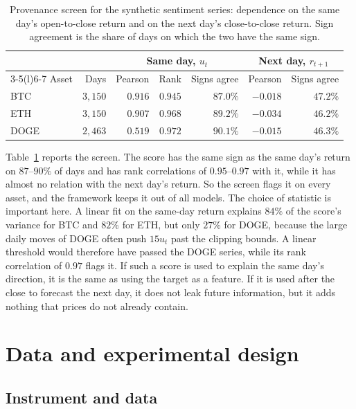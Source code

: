 \documentclass[preprint,12pt,authoryear,a4paper]{elsarticle}
\begin{document}
\begin{table}[htbp]\centering\small
\caption{Provenance screen for the synthetic sentiment series: dependence on the
same day's open-to-close return and on the next day's close-to-close return. Sign
agreement is the share of days on which the two have the same sign.}
\label{tab:leak}
\begin{tabular}{@{}lrrrrrr@{}}
\toprule
 & & \multicolumn{3}{c}{Same day, $u_t$} & \multicolumn{2}{c}{Next day, $r_{t+1}$} \\
\cmidrule(lr){3-5}\cmidrule(l){6-7}
Asset & Days & Pearson & Rank & Signs agree & Pearson & Signs agree \\
\midrule
BTC  & $3{,}150$ & $0.916$ & $0.945$ & $87.0\%$ & $-0.018$ & $47.2\%$ \\
ETH  & $3{,}150$ & $0.907$ & $0.968$ & $89.2\%$ & $-0.034$ & $46.2\%$ \\
DOGE & $2{,}463$ & $0.519$ & $0.972$ & $90.1\%$ & $-0.015$ & $46.3\%$ \\
\bottomrule
\end{tabular}
\end{table}

Table~\ref{tab:leak} reports the screen. The score has the same sign as the same
day's return on $87$--$90\%$ of days and has rank correlations of $0.95$--$0.97$
with it, while it has almost no relation with the next day's return. So the screen
flags it on every asset, and the framework keeps it out of all models. The choice
of statistic is important here. A linear fit on the same-day return explains $84\%$
of the score's variance for BTC and $82\%$ for ETH, but only $27\%$ for DOGE,
because the large daily moves of DOGE often push $15u_t$ past the clipping bounds. A
linear threshold would therefore have passed the DOGE series, while its rank
correlation of $0.97$ flags it. If such a score is used to explain the same day's
direction, it is the same as using the target as a feature. If it is used after the
close to forecast the next day, it does not leak future information, but it adds
nothing that prices do not already contain.

\section{Data and experimental design}\label{sec:method}

\subsection{Instrument and data}
\end{document}
